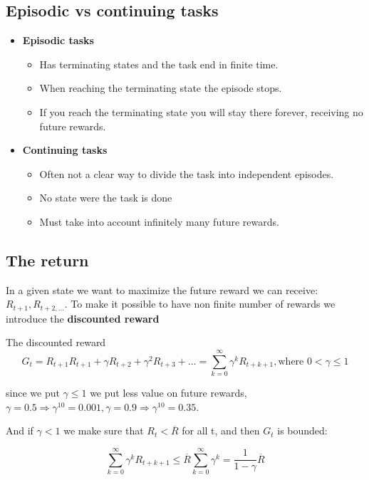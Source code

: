 \subsection*{Episodic vs continuing tasks}
\begin{itemize}
	\item \textbf{Episodic tasks}
	\begin{itemize}
		\item Has terminating states and the task end in finite time.
		\item When reaching the terminating state the episode stops.
		\item If you reach the terminating state you will stay there forever, receiving no future rewards.
	\end{itemize}
	\item \textbf{Continuing tasks}
	\begin{itemize}
		\item Often not a clear way to divide the task into independent episodes.
		\item No state were the task is done
		\item Must take into account infinitely many future rewards.
	\end{itemize}
\end{itemize}


\subsection*{The return}
In a given state we want to maximize the future reward we can receive: $R_{t+1},R_{t+2, ...}$. To make it possible to have non finite number of rewards we introduce the \textbf{discounted reward}

	\begin{wbox}{The discounted reward}
		\begin{equation}
			G_t = R_{t+1} R_{t+1} + \gamma R_{t+2} + \gamma^{2} R_{t+3} + \ldots = \sum_{k=0}^{\infty} \gamma^{k}R_{t+k+1}, \text{where } 0 < \gamma \le 1
		\end{equation}
	\end{wbox}

since we put $\gamma \le 1$ we put less value on future rewards, $\gamma = 0.5 \Rightarrow \gamma^{10} = 0.001, \gamma = 0.9 \Rightarrow \gamma^{10} = 0.35$.

And if $\gamma < 1$ we make sure that $R_t < \overline{R}$ for all t, and then $G_t$ is bounded:

	\begin{equation}
		\sum_{k=0}^{\infty} \gamma^{k}R_{t+k+1} \le \overline{R}\sum_{k=0}^{\infty} \gamma^{k} = \frac{1} {1-\gamma} \overline{R}
	\end{equation}


